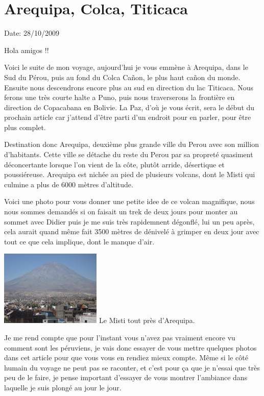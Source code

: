 \section{Arequipa, Colca, Titicaca}

Date: 28/10/2009

\begin{multicols}{2}

Hola amigos !!

Voici le suite de mon voyage, aujourd'hui je vous emmène à Arequipa, dans le Sud du Pérou, puis au fond du Colca Cañon, le plus haut cañon du monde. Ensuite nous descendrons encore plus au sud en direction du lac Titicaca. Nous ferons une très courte halte a Puno, puis nous traverserons la frontière en direction de Copacabana en Bolivie. La Paz, d'où je vous écrit, sera le début du prochain article car j'attend d'être parti d'un endroit pour en parler, pour être plus complet.

Destination donc Arequipa, deuxième plus grande ville du Perou avec son million d'habitants. Cette ville se détache du reste du Perou par sa propreté quasiment déconcertante lorsque l'on vient de la côte, plutôt arride, désertique et poussiéreuse. Arequipa est nichée au pied de plusieurs volcans, dont le Misti qui culmine a plus de 6000 mètres d'altitude.

Voici une photo pour vous donner une petite idee de ce volcan magnifique, nous nous sommes demandés si on faisait un trek de deux jours pour monter au sommet avec Didier puis je me suis très rapidemnent dégonflé, lui un peu après, cela aurait quand même fait 3500 mètres de dénivelé à grimper en deux jour avec tout ce que cela implique, dont le manque d'air.

\hspace*{-0.65cm}
\includegraphics[width=4.8cm]{articles/Arequipa-colca-titicaca/1256606928TSDk.jpg}
Le Misti tout près d'Arequipa.

Je me rend compte que pour l'instant vous n'avez pas vraiment encore vu comment sont les péruviens, je vais donc essayer de vous mettre quelques photos dans cet article pour que vous vous en rendiez mieux compte. Même si le côté humain du voyage ne peut pas se raconter, et c'est pour ça que je n'essai que très peu de le faire, je pense important d'essayer de vous montrer l'ambiance dans laquelle je suis plongé au jour le jour.


\end{multicols}
